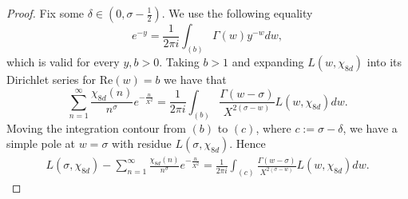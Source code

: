 \documentclass[10pt,a4paper]{amsart}
\theoremstyle{plain}
\theoremstyle{definition}
\theoremstyle{remark}
\begin{document}
\begin{proof}
Fix some $\delta \in \left( 0, \sigma - \frac{1}{2} \right)$. We use the following equality 
\begin{equation}\label{Exponential}
e^{-y}=\frac{1}{2\pi i}\int_{(b)}\Gamma(w)y^{-w}dw,
\end{equation}
which is valid for every $y,b>0$. Taking $b>1$ and  expanding $L(w,\chi_{8d})$ into its Dirichlet series for $\text{Re}(w)=b$ we have that
\begin{equation*}
\sum_{n=1}^{\infty}\frac{\chi_{8d}(n)}{n^{\sigma}} e^{-\frac{n}{X^2}}=\frac{1}{2\pi i}\int_{(b)}\frac{\Gamma(w-\sigma)}{X^{2(\sigma-w)}}L(w,\chi_{8d})dw.
\end{equation*}
Moving the integration contour from $(b)$ to $(c)$, where $c := \sigma - \delta$, we have a simple pole at $w=\sigma$ with residue $L(\sigma,\chi_{8d})$. Hence
\begin{align*}
L(\sigma,\chi_{8d})-\sum_{n=1}^{\infty}\frac{\chi_{8d}(n)}{n^{\sigma}} e^{-\frac{n}{X^2}}=\frac{1}{2\pi i}\int_{(c)}\frac{\Gamma(w-\sigma)}{X^{2(\sigma-w)}}L(w,\chi_{8d})dw.
\end{align*}


\end{proof}
\end{document}
